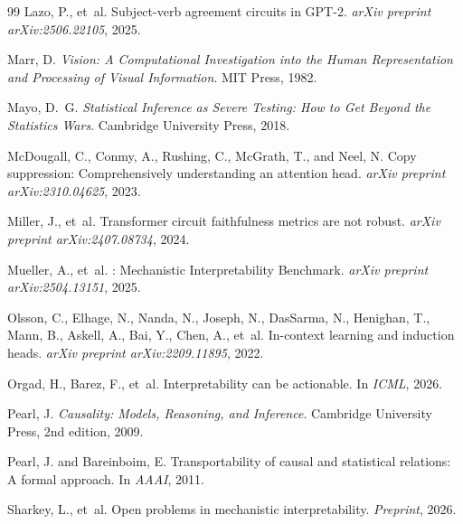 \documentclass[10pt]{article}
\begin{document}
\begin{thebibliography}{99}
Lazo, P., et~al.
\newblock Subject-verb agreement circuits in {GPT}-2.
\newblock \emph{arXiv preprint arXiv:2506.22105}, 2025.

Marr, D.
\newblock \emph{Vision: A Computational Investigation into the Human Representation and Processing of Visual Information}.
\newblock MIT Press, 1982.

Mayo, D.~G.
\newblock \emph{Statistical Inference as Severe Testing: How to Get Beyond the Statistics Wars}.
\newblock Cambridge University Press, 2018.

McDougall, C., Conmy, A., Rushing, C., McGrath, T., and Neel, N.
\newblock Copy suppression: Comprehensively understanding an attention head.
\newblock \emph{arXiv preprint arXiv:2310.04625}, 2023.

Miller, J., et~al.
\newblock Transformer circuit faithfulness metrics are not robust.
\newblock \emph{arXiv preprint arXiv:2407.08734}, 2024.

Mueller, A., et~al.
: Mechanistic Interpretability Benchmark.
\newblock \emph{arXiv preprint arXiv:2504.13151}, 2025.

Olsson, C., Elhage, N., Nanda, N., Joseph, N., DasSarma, N., Henighan, T., Mann, B., Askell, A., Bai, Y., Chen, A., et~al.
\newblock In-context learning and induction heads.
\newblock \emph{arXiv preprint arXiv:2209.11895}, 2022.

Orgad, H., Barez, F., et~al.
\newblock Interpretability can be actionable.
\newblock In \emph{ICML}, 2026.

Pearl, J.
\newblock \emph{Causality: Models, Reasoning, and Inference}.
\newblock Cambridge University Press, 2nd edition, 2009.

Pearl, J. and Bareinboim, E.
\newblock Transportability of causal and statistical relations: A formal approach.
\newblock In \emph{AAAI}, 2011.

Sharkey, L., et~al.
\newblock Open problems in mechanistic interpretability.
\newblock \emph{Preprint}, 2026.


\end{thebibliography}
\end{document}
